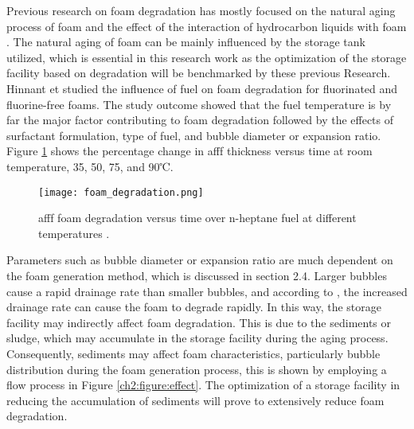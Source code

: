 Previous research on foam degradation has mostly focused on the natural aging process of foam \cite{do2011numerical} and the effect of the interaction of hydrocarbon liquids with foam \cite{osei2015foam}.  The natural aging of foam can be mainly influenced by the storage tank utilized, which is essential in this research work as the optimization of the storage facility based on degradation will be benchmarked by these previous Research. Hinnant et \cite{hinnant2017influence} studied the influence of fuel on foam degradation for fluorinated and fluorine-free foams. The study outcome showed that the fuel temperature is by far the major factor contributing to foam degradation followed by the effects of surfactant formulation, type of fuel, and bubble diameter or expansion ratio. Figure \ref{ch2:figure:degradation} shows the percentage change in \acrshort{afff} thickness versus time at room temperature, 35, 50, 75, and 90℃.

\begin{figure}[H]
    \texttt{[image: foam\_degradation.png]}
    \caption{\acrshort{afff} foam degradation versus time over n-heptane fuel at different temperatures \cite{hinnant2017influence}.}
    \label{ch2:figure:degradation}
\end{figure}

Parameters such as bubble diameter or expansion ratio are much dependent on the foam generation method, which is discussed in section 2.4. Larger bubbles cause a rapid drainage rate than smaller bubbles, and according to \cite{hinnant2017influence}, the increased drainage rate can cause the foam to degrade rapidly. In this way, the storage facility may indirectly affect foam degradation. This is due to the sediments or sludge, which may accumulate in the storage facility during the aging process. Consequently, sediments may affect foam characteristics, particularly bubble distribution during the foam generation process, this is shown by employing a flow process in Figure \ref{ch2:figure:effect}. The optimization of a storage facility in reducing the accumulation of sediments will prove to extensively reduce foam degradation.

